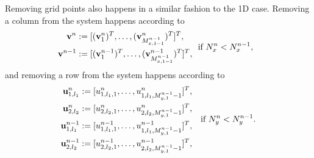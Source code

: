 \documentclass[fleqn]{jaes}
\begin{document}
Removing grid points also happens in a similar fashion to the 1D case. Removing a column from the system happens according to 
\begin{equation}
\begin{aligned}
    \!\!\!\!\v^n &:= [(\v_1^n)^T, \hdots, (\v_{M_{x,1-1}^{n-1}}^n)^T]^T,\\
     \!\!\!\!\v^{n-1} &:= [(\v_1^{n-1})^T, \hdots, (\v_{M_{x,1-1}^{n-1}}^{n-1})^T]^T,
    \end{aligned}
\ \ \text{if } N_x^n < N_x^{n-1},
\end{equation}
and removing a row from the system happens according to
\begin{equation}
    \begin{aligned}
        \u_{1,l_1}^n &:= [u_{1,l_1, 1}^n, \hdots, u_{1,l_1, M_{y,1}^{n-1}-1}^n]^T,\\
        \u_{2,l_2}^n &:= [u_{2,l_2, 1}^n,\hdots, u^n_{2,l_2, M_{y, 1}^{n-1}-1}]^T,\\
        \u_{1,l_1}^{n-1} &:= [u_{1,l_1, 1}^{n-1}, \hdots, u_{1,l_1, M_{y,1}^{n-1}-1}^{n-1}]^T,\\
        \u_{2,l_2}^{n-1} &:= [u_{2,l_2, 1}^{n-1},\hdots, u^{n-1}_{2,l_2, M_{y, 1}^{n-1}-1}]^T,
    \end{aligned}\quad \text{if } N_y^n < N_y^{n-1}.
\end{equation}
\end{document}
